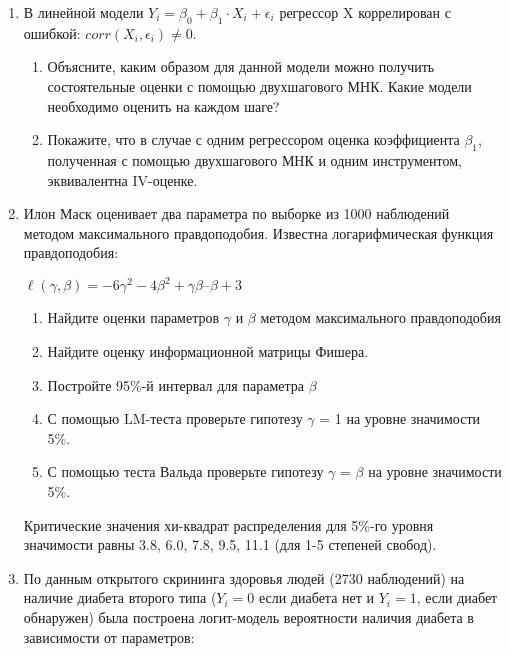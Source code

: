 \begin{enumerate}
\item 
В линейной модели \( Y_i = \beta_0 + \beta_1 \cdot X_i + \epsilon_i \) регрессор X коррелирован с ошибкой: \( corr(X_i, \epsilon_i  ) \neq 0 \).

\begin{enumerate}
  \item Объясните, каким образом для данной модели можно получить состоятельные оценки с помощью двухшагового МНК. 
  Какие модели необходимо оценить на каждом шаге?
  \item Покажите, что в случае с одним регрессором оценка коэффициента $\beta_1$, 
  полученная с помощью двухшагового МНК и одним инструментом, эквивалентна IV-оценке.
\end{enumerate}

\item Илон Маск оценивает два параметра по выборке из 1000 наблюдений методом максимального правдоподобия. Известна логарифмическая функция правдоподобия:

\( \ell ( \gamma, \beta) = -6 \gamma^2-4 \beta^2+ \gamma \beta– \beta+3 \)

\begin{enumerate}
\item  Найдите оценки параметров \( \gamma \) и \( \beta \) методом максимального правдоподобия

\item Найдите оценку информационной матрицы Фишера.

\item  Постройте 95\%-й интервал для параметра \( \beta \) 

\item  С помощью LM-теста проверьте гипотезу \( \gamma \) = 1 на уровне значимости 5\%.

\item С помощью теста Вальда проверьте гипотезу \( \gamma \) = \( \beta \)  на уровне значимости 5\%.
\end{enumerate}

Критические значения хи-квадрат распределения для 5\%-го уровня значимости равны 3.8, 6.0, 7.8, 9.5, 11.1 (для 1-5 степеней свобод). 


\item По данным открытого скрининга здоровья людей (2730 наблюдений) на наличие диабета второго типа 
($Y_i= 0$ если диабета нет и $Y_i=1$, если диабет обнаружен) 
была построена логит-модель вероятности наличия диабета в зависимости от параметров:


\end{enumerate}
